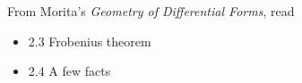 \documentclass{homework}
\author{Jim Fowler}
\date{Week 6: Frobenius theorem}
\begin{document}
\maketitle

From Morita's \textit{Geometry of Differential Forms}, read
\begin{itemize}
\item 2.3 Frobenius theorem
\item 2.4 A few facts
\end{itemize}
\end{document}
